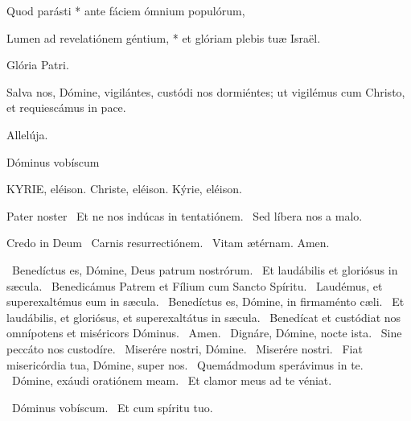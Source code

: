 Quod parásti * ante fáciem ómnium populórum,

Lumen ad revelatiónem géntium, * et glóriam plebis tuæ Israël.

Glória Patri.

 Salva nos, Dómine, vigilántes, custódi nos dormiéntes; ut vigilémus cum Christo, et requiescámus in pace.

 Allelúja.

 Dóminus vobíscum 


KYRIE, eléison. Christe, eléison. Kýrie, eléison.

Pater noster  \V\ Et ne nos indúcas in tentatiónem. \R\ Sed líbera nos a malo.

Credo in Deum  \V\ Carnis resurrectiónem. \R\ Vitam ætérnam. Amen.

\V\ Benedíctus es, Dómine, Deus patrum nostrórum. \R\ Et laudábilis et gloriósus in sæcula. \V\ Benedicámus Patrem et Fílium cum Sancto Spíritu. \R\ Laudémus, et superexaltémus eum in sæcula. \V\ Benedíctus es, Dómine, in firmaménto cæli. \R\ Et laudábilis, et gloriósus, et superexaltátus in sæcula. \V\ Benedícat et custódiat nos omnípotens et miséricors Dóminus. \R\ Amen. \V\ Dignáre, Dómine, nocte ista. \R\ Sine peccáto nos custodíre. \V\ Miserére nostri, Dómine. \R\ Miserére nostri. \V\ Fiat misericórdia tua, Dómine, super nos. \R\ Quemádmodum sperávimus in te. \V\ Dómine, exáudi oratiónem meam. \R\ Et clamor meus ad te véniat.


\V\ Dóminus vobíscum. \R\ Et cum spíritu tuo.

